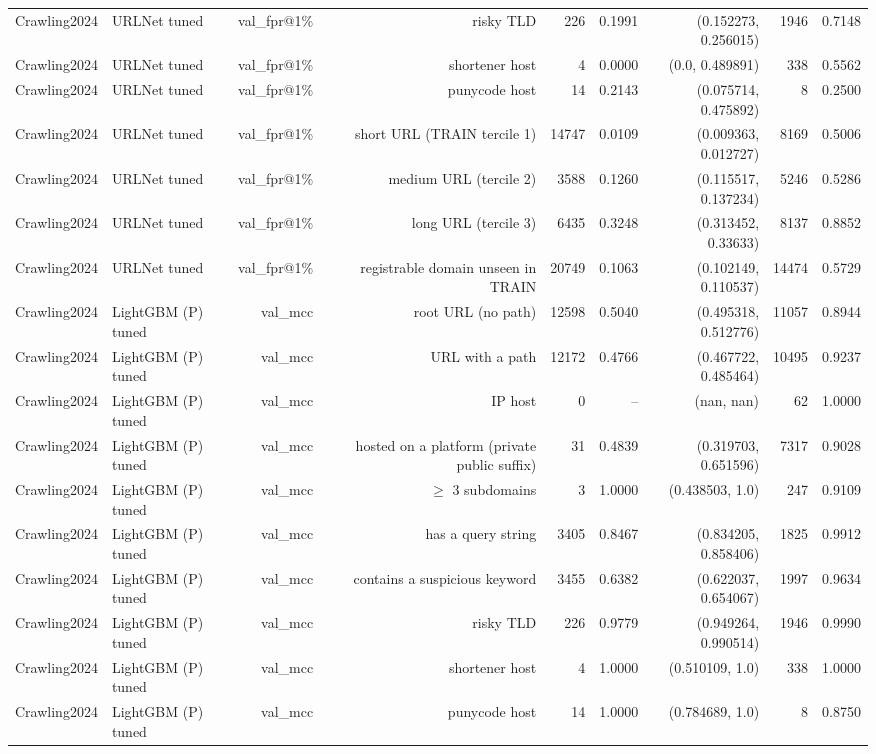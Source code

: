 \begin{table}[t]
\begin{tabular}{llrrrrrrr}
Crawling2024 & URLNet tuned & val\_fpr@1\% & risky TLD & 226 & 0.1991 & (0.152273, 0.256015) & 1946 & 0.7148 \\
Crawling2024 & URLNet tuned & val\_fpr@1\% & shortener host & 4 & 0.0000 & (0.0, 0.489891) & 338 & 0.5562 \\
Crawling2024 & URLNet tuned & val\_fpr@1\% & punycode host & 14 & 0.2143 & (0.075714, 0.475892) & 8 & 0.2500 \\
Crawling2024 & URLNet tuned & val\_fpr@1\% & short URL (TRAIN tercile 1) & 14747 & 0.0109 & (0.009363, 0.012727) & 8169 & 0.5006 \\
Crawling2024 & URLNet tuned & val\_fpr@1\% & medium URL (tercile 2) & 3588 & 0.1260 & (0.115517, 0.137234) & 5246 & 0.5286 \\
Crawling2024 & URLNet tuned & val\_fpr@1\% & long URL (tercile 3) & 6435 & 0.3248 & (0.313452, 0.33633) & 8137 & 0.8852 \\
Crawling2024 & URLNet tuned & val\_fpr@1\% & registrable domain unseen in TRAIN & 20749 & 0.1063 & (0.102149, 0.110537) & 14474 & 0.5729 \\
Crawling2024 & LightGBM (P) tuned & val\_mcc & root URL (no path) & 12598 & 0.5040 & (0.495318, 0.512776) & 11057 & 0.8944 \\
Crawling2024 & LightGBM (P) tuned & val\_mcc & URL with a path & 12172 & 0.4766 & (0.467722, 0.485464) & 10495 & 0.9237 \\
Crawling2024 & LightGBM (P) tuned & val\_mcc & IP host & 0 & -- & (nan, nan) & 62 & 1.0000 \\
Crawling2024 & LightGBM (P) tuned & val\_mcc & hosted on a platform (private public suffix) & 31 & 0.4839 & (0.319703, 0.651596) & 7317 & 0.9028 \\
Crawling2024 & LightGBM (P) tuned & val\_mcc & $\geq$ 3 subdomains & 3 & 1.0000 & (0.438503, 1.0) & 247 & 0.9109 \\
Crawling2024 & LightGBM (P) tuned & val\_mcc & has a query string & 3405 & 0.8467 & (0.834205, 0.858406) & 1825 & 0.9912 \\
Crawling2024 & LightGBM (P) tuned & val\_mcc & contains a suspicious keyword & 3455 & 0.6382 & (0.622037, 0.654067) & 1997 & 0.9634 \\
Crawling2024 & LightGBM (P) tuned & val\_mcc & risky TLD & 226 & 0.9779 & (0.949264, 0.990514) & 1946 & 0.9990 \\
Crawling2024 & LightGBM (P) tuned & val\_mcc & shortener host & 4 & 1.0000 & (0.510109, 1.0) & 338 & 1.0000 \\
Crawling2024 & LightGBM (P) tuned & val\_mcc & punycode host & 14 & 1.0000 & (0.784689, 1.0) & 8 & 0.8750 \\

\end{tabular}
\end{table}
